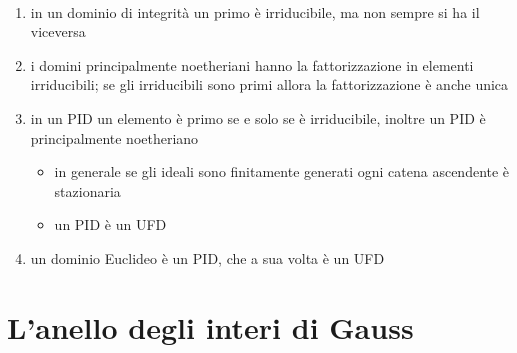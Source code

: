 \begin{osservazione}
	\
	\begin{enumerate}
		\item in un dominio di integrità un primo è irriducibile, ma non sempre si ha il viceversa
		\item i domini principalmente noetheriani hanno la fattorizzazione in elementi irriducibili; se gli irriducibili sono primi allora la fattorizzazione è anche unica
		\item in un PID un elemento è primo se e solo se è irriducibile, inoltre un PID è principalmente noetheriano 
		\begin{itemize}
			\item in generale se gli ideali sono finitamente generati ogni catena ascendente è stazionaria
			\item un PID è un UFD
		\end{itemize}
	\item un dominio Euclideo è un PID, che a sua volta è un UFD
	\end{enumerate}
\end{osservazione}




\section{L'anello degli interi di Gauss}
